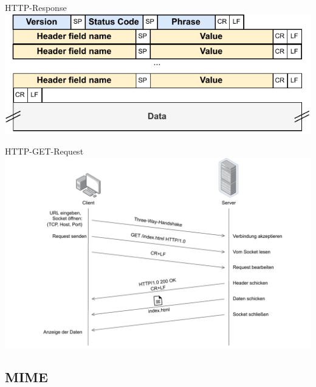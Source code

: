\begin{defi}{HTTP-Response}
    \centering
    \includegraphics[width=.7\textwidth]{includes/figures/defi_http_response_header.pdf}
\end{defi}

\begin{example}{HTTP-GET-Request}
    \centering
    \includegraphics[width=.9\textwidth]{includes/figures/defi_http_get.pdf}
\end{example}

\subsection{MIME}

